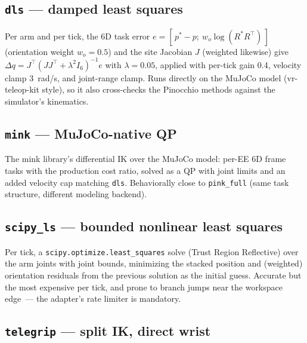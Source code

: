 \subsection{\texttt{dls} — damped least squares}
\label{app:dls}

Per arm and per tick, the 6D task error
\(e = [\,p^\ast - p;\ w_o \log(R^\ast R^\top)\,]\) (orientation weight
\(w_o=0.5\)) and the site Jacobian \(J\) (weighted likewise) give
\(\Delta q = J^\top (J J^\top + \lambda^2 I_6)^{-1} e\) with
\(\lambda = 0.05\), applied with per-tick gain 0.4, velocity clamp
3~rad/s, and joint-range clamp. Runs directly on the MuJoCo model
(vr-teleop-kit style), so it also cross-checks the Pinocchio methods
against the simulator's kinematics.

\subsection{\texttt{mink} — MuJoCo-native QP}
\label{app:mink}

The mink library's differential IK over the MuJoCo model: per-EE 6D frame
tasks with the production cost ratio, solved as a QP with joint limits and
an added velocity cap matching \texttt{dls}. Behaviorally close to
\texttt{pink\_full} (same task structure, different modeling backend).

\subsection{\texttt{scipy\_ls} — bounded nonlinear least squares}
\label{app:scipy-ls}

Per tick, a \texttt{scipy.optimize.least\_squares} solve (Trust Region
Reflective) over the arm joints with joint bounds, minimizing the stacked
position and (weighted) orientation residuals from the previous solution as
the initial guess. Accurate but the most expensive per tick, and prone to
branch jumps near the workspace edge~--- the adapter's rate limiter is
mandatory.

\subsection{\texttt{telegrip} — split IK, direct wrist}
\label{app:telegrip}


